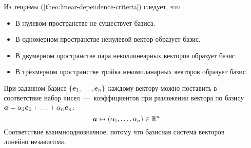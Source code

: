 \documentclass[a4paper,12pt]{article}
\begin{document}
  Из теоремы (\ref{theo:linear-dependence-criteria}) следует, что
  \begin{itemize}
    \item В нулевом пространстве не существует базиса.
    \item В одномерном пространстве ненулевой вектор образует базис.
    \item В двумерном пространстве пара неколлинеарных векторов образует базис.
    \item В трёхмерном пространстве тройка некомпланарных векторов образует базис.
  \end{itemize}
  
  \begin{remark}
    При заданном базисе $\{\boldsymbol e_1, \ldots, \boldsymbol e_n\}$ каждому вектору можно поставить в соответствие набор чисел~---~коэффициентов при разложении вектора по базису $\bds a \hm= \alpha_1 \bds e_1 \hm+ \ldots \hm+ \alpha_n \bds e_n$:
    \[
        \boldsymbol a \leftrightarrow (\alpha_1, \ldots, \alpha_n) \in \operatorname{\mathbb R}^n
    \]
    Соответствие взаимнооднозначное, потому что базисная система векторов линейно независима.
  \end{remark}
  
\end{document}
